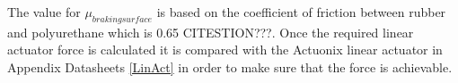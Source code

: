 \documentclass[../main.tex]{subfiles}
\begin{document}
The value for $\mu_{braking surface}$ is based on the coefficient of friction between rubber and polyurethane which is 0.65 CITESTION???. Once the required linear actuator force is calculated it is compared with the Actuonix linear actuator in Appendix Datasheets \ref{LinAct} in order to make sure that the force is achievable.
\end{document}
